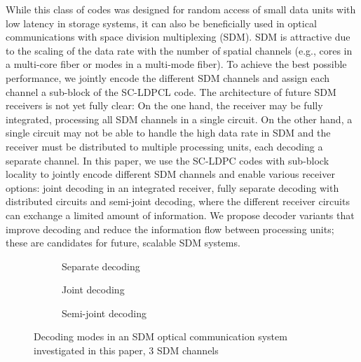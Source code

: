 While this class of codes was designed for random access of small data units with low latency in storage systems, it can also be beneficially used in optical communications with space division multiplexing (SDM). SDM is attractive due to the scaling of the data rate with the number of spatial channels (e.g., cores in a multi-core fiber or modes in a multi-mode fiber). To achieve the best possible performance, we jointly encode the different SDM channels and assign each channel a sub-block of the SC-LDPCL code. The architecture of future SDM receivers is not yet fully clear: On the one hand, the receiver may be fully integrated, processing all SDM channels in a single circuit. On the other hand, a single circuit may not be able to handle the high data rate in SDM and the receiver must be distributed to multiple processing units, each decoding a separate channel. In this paper, we use the SC-LDPC codes with sub-block locality to jointly encode different SDM channels and enable various receiver options: joint decoding in an integrated receiver, fully separate decoding with distributed circuits and semi-joint decoding, where the different receiver circuits can exchange a limited amount of information. We propose decoder variants that improve decoding and reduce the information flow between processing units; these are candidates for future, scalable SDM systems.
\begin{figure*}[t]
    \begin{subfigure}{0.33\textwidth}
        \centering
        
        \caption{Separate decoding}
        \label{fig_separate_decoding}
    \end{subfigure}
    \begin{subfigure}{0.33\textwidth}
        \centering
        
        \caption{Joint decoding}
        \label{fig_joint_decoding}
    \end{subfigure}
    \begin{subfigure}{0.33\textwidth}
        \centering
        
        \caption{Semi-joint decoding}
        \label{fig_neighbor_decoding}
    \end{subfigure}
    \vspace*{2ex}
    \caption{Decoding modes in an SDM optical communication system investigated in this paper, 3 SDM channels}
    \label{fig_decoding_modes}
\end{figure*}\vspace*{-0.7ex}